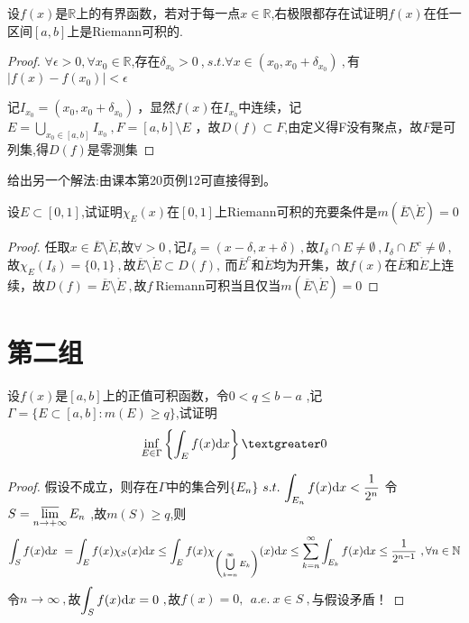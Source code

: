 设$f(x)$是$\mathbb{R}$上的有界函数，若对于每一点$x\in \mathbb{R}$,右极限都存在试证明$f(x)$在任一区间$[a,b]$上是Riemann可积的.
\begin{proof}
	$\forall\epsilon>0,\forall x_0\in \mathbb{R}$,存在$\delta_{x_0}>0\ $,$\ s.t. \forall x\in(x_0,x_0+\delta_{x_0})\ ,$有$\mid f(x)-f(x_0)\mid<\epsilon $ \par 记$I_{x_0}=(x_0,x_0+\delta_{x_0})\ $，显然$f(x)$在$I_{x_0}$中连续，记$E=\bigcup\limits_{x_0\in [a,b]}I_{x_0}\ ,F=[a,b]\setminus E$ ，故$D(f)\subset F$,由定义得F没有聚点，故$F$是可列集,得$D(f)$是零测集
\end{proof}

给出另一个解法:由课本第20页例12可直接得到。


设$E \subset [0,1]$,试证明$\chi_E(x)$在$[0,1]$上Riemann可积的充要条件是$m(\overline{E}\setminus\mathring{E})=0$
\begin{proof}
任取$x\in\overline{E}\setminus\mathring{E}$,故$\forall>0\ ,$记$I_{\delta}=(x-\delta,x+\delta)\ ,$故$I_{\delta}\cap E\neq \emptyset\ ,I_{\delta}\cap E^c\neq \emptyset\ ,$故$\chi_{E}(I_{\delta})=\{0,1\}\ ,$故$\overline{E}\setminus\mathring{E} \subset D(f),\ $而${\overline{E}}^c$和$\mathring{E}$均为开集，故$f(x)$在$\overline{E}$和$\mathring{E}$上连续，故$D(f)=\overline{E}\setminus\mathring{E}\ ,$故$f\  $Riemann可积当且仅当$m(\overline{E}\setminus\mathring{E})=0$
\end{proof}



\section{第二组}

 设$f(x)$是$[a,b]$上的正值可积函数，令$0<q\leq b-a $ ,记$\Gamma=\{E\subset [a,b]:m(E) \geq q\} $,试证明$$\inf_{E \in \Gamma} \left\{ \int_E f(x) \di{x} \right\} \textgreater 0$$
\begin{proof}
假设不成立，则存在$\Gamma$中的集合列$\{E_n\}\ s.t.\ \displaystyle{\int_{E_n}f(x)\di{x}<\frac{1}{2^n}}$
令$S=\varlimsup\limits_{n \to +\infty}E_n\ $,故$m(S)\geq q$,则
$$\int_S f(x)\di{x}\ =\int_{E}f(x)\chi_{S}(x)\di{x}\leq \int_{E}f(x)\chi_{\left(\bigcup\limits_{k=n}^{\infty}E_k\right)}(x)\di{x}\leq \sum_{k=n}^{\infty}\int_{E_k} f(x)\di{x}\leq \frac{1}{2^{n-1}}\ ,\forall n\in \mathbb{N}$$
令$n\to \infty\ ,$故$\displaystyle{\int_S f(x)\di{x}=0}\ ,$故$f(x)=0,\ \ a.e.\ x \in S\ ,$与假设矛盾！
\end{proof}

